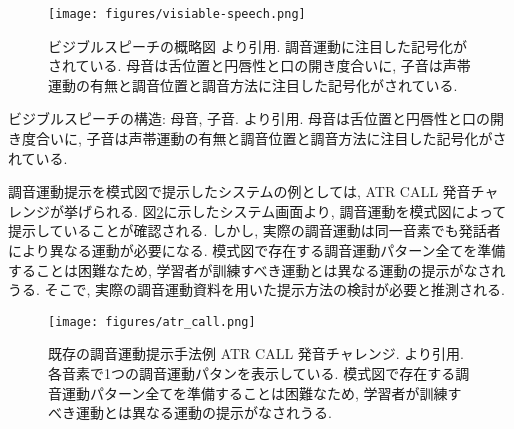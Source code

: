 \begin{figure}[hbtp]
 \centering
 \texttt{[image: figures/visiable-speech.png]}
 \caption[ビジブルスピーチの概略図]{ビジブルスピーチの概略図 \cite{vs_png}より引用. 調音運動に注目した記号化がされている. 母音は舌位置と円唇性と口の開き度合いに, 子音は声帯運動の有無と調音位置と調音方法に注目した記号化がされている. }
 \label{fig:vs}
\end{figure}

\begin{table}[hbtp]
 \centering
 \caption[ビジブルスピーチの構造]{ビジブルスピーチの構造: 母音, 子音. \cite{hattori}より引用. 母音は舌位置と円唇性と口の開き度合いに, 子音は声帯運動の有無と調音位置と調音方法に注目した記号化がされている. }
  \quad
 \label{visiable_speech}
\end{table}

調音運動提示を模式図で提示したシステムの例としては, ATR CALL 発音チャレンジ\cite{ATRCALL_web}が挙げられる. 図\ref{ATRCALL}に示したシステム画面より, 調音運動を模式図によって提示していることが確認される.
しかし, 実際の調音運動は同一音素でも発話者により異なる運動が必要になる. 模式図で存在する調音運動パターン全てを準備することは困難なため, 学習者が訓練すべき運動とは異なる運動の提示がなされうる.
そこで, 実際の調音運動資料を用いた提示方法の検討が必要と推測される.

\begin{figure}[hbtp]
 \centering
   \texttt{[image: figures/atr\_call.png]}
 \caption[既存の調音運動提示手法例]{既存の調音運動提示手法例 ATR CALL 発音チャレンジ. \cite{ATRCALL_web}より引用. 各音素で1つの調音運動パタンを表示している. 模式図で存在する調音運動パターン全てを準備することは困難なため, 学習者が訓練すべき運動とは異なる運動の提示がなされうる. }
 \label{ATRCALL}
\end{figure}

\newpage
